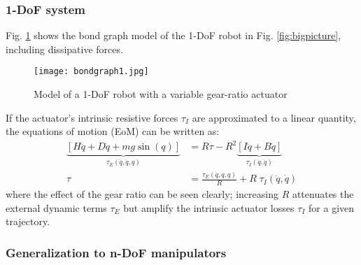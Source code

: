 \subsubsection{1-DoF system}
\label{sec:1DOFSystem}

Fig. \ref{fig:bondgraph1} shows the bond graph model of the 1-DoF robot in Fig. \ref{fig:bigpicture}, including dissipative forces.

\begin{figure}[htp]
	\centering
		\texttt{[image: bondgraph1.jpg]}
	\caption{Model of a 1-DoF robot with a variable gear-ratio actuator}
	\label{fig:bondgraph1}
\end{figure}

If the actuator's intrinsic resistive forces $\tau_I$ are approximated to a linear quantity, the equations of motion (EoM) can be written as:
%
\begin{align}
	\underbrace{\left[	H \ddot{q} + D \dot{q} + mg\sin( q )	\right]}_{\tau_{E}(\ddot{q},\dot{q},q)}
	&= R \tau - R^2
	\underbrace{\left[ I \ddot{q} + B \dot{q}	\right]}_{\tau_{I}(\ddot{q},\dot{q})} \\
	\tau &= 	\frac{\tau_{E}(\ddot{q},\dot{q},q)}{R} + R \; \tau_{I}(\ddot{q},\dot{q})
	\label{eq:1dofEoM}
\end{align}
%
where the effect of the gear ratio can be seen clearly; increasing $R$ attenuates the external dynamic terms $\tau_{E}$ but amplify the intrinsic actuator losses $\tau_{I}$ for a given trajectory.

\subsubsection{Generalization to n-DoF manipulators}
\label{sec:GeneralizationToNDOFManipulators}

